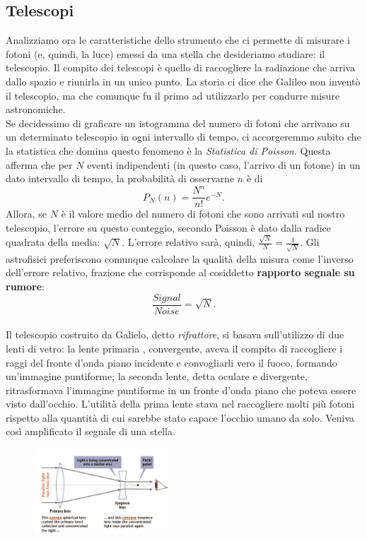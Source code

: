 \documentclass[a4paper,11pt]{article}
\begin{document}
\subsection{Telescopi}
Analizziamo ora le caratteristiche dello strumento che ci permette di misurare i fotoni (e, quindi, la luce) emessi da una stella che desideriamo studiare: il telescopio.
Il compito dei telescopi è quello di raccogliere la radiazione che arriva dallo spazio e riunirla in un unico punto. La storia ci dice che Galileo non inventò il telescopio, ma che comunque fu il primo ad utilizzarlo per condurre misure astronomiche.\\ 
Se decidessimo di graficare un istogramma del numero di fotoni che arrivano su un determinato telescopio in ogni intervallo di tempo, ci accorgeremmo subito che la statistica che domina questo fenomeno è la \textit{Statistica di Poisson}.
Questa afferma che per \(N\) eventi indipendenti (in questo caso, l'arrivo di un fotone) in un dato intervallo di tempo, la probabilità di osservarne \(n\) è di 
\begin{equation*}
    P_N(n) = \frac{N^n}{n!}e^{-N}.
\end{equation*}
Allora, se \(N\) è il valore medio del numero di fotoni che sono arrivati sul nostro telescopio, l'errore su questo conteggio, secondo Poisson è dato dalla radice quadrata della media: \(\sqrt{N}\). 
L'errore relativo sarà, quindi, \(\frac{\sqrt{N}}{N} = \frac{1}{\sqrt{N}}\). 
Gli astrofisici preferiscono comunque calcolare la qualità della misura come l'inverso dell'errore relativo, frazione che corrisponde al cosiddetto \textbf{rapporto segnale su rumore}:
\begin{equation*}
    \frac{Signal}{Noise} = \sqrt{N}.
\end{equation*}\\
Il telescopio costruito da Galielo, detto \textit{rifrattore}, si basava sull'utilizzo di due lenti di vetro: la lente primaria , convergente, aveva il compito di raccogliere i raggi del fronte d'onda piano incidente e convogliarli vero il fuoco, formando un'immagine puntiforme; la seconda lente, detta oculare e divergente, ritrasformava l'immagine puntiforme in un fronte d'onda piano che poteva essere visto dall'occhio. 
L'utilità della prima lente stava nel raccogliere molti più fotoni rispetto alla quantità di cui sarebbe stato capace l'occhio umano da solo. Veniva così amplificato il segnale di una stella. 
\begin{figure}[h!!]
    \centering
    \includegraphics[width=5cm]{WhatsApp Image 2023-01-09 at 02.42.01.jpeg}
    \label{fig:my_label4}
\end{figure}\\
\end{document}
